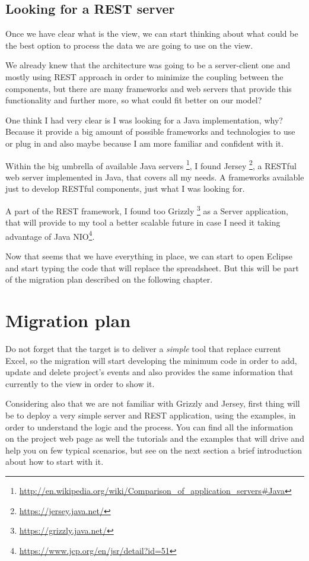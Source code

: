 \section{Looking for a REST server}
Once we have clear what is the view, we can start thinking about what could be
the best option to process the data we are going to use on the view.

We already knew that the architecture was going to be a server-client one and
mostly using REST approach in order to minimize the coupling between the
components, but there are many frameworks and web servers that provide this
functionality and further more, so what could fit better on our model?

One think I had very clear is I was looking for a Java implementation, why?
Because it provide a big amount of possible frameworks and technologies to
use or plug in and also maybe because I am more familiar and confident
with it.

Within the big umbrella of available Java servers
\footnote{\url{http://en.wikipedia.org/wiki/Comparison\_of\_application\_servers\#Java}},
I found Jersey \footnote{\url{https://jersey.java.net/}}, a RESTful web server
implemented in Java, that covers all my needs. A frameworks available just to
develop RESTful components, just what I was looking for.

A part of the REST framework, I found too Grizzly
\footnote{\url{https://grizzly.java.net/}} as a Server application, that will
provide to my tool a better scalable future in case I need it taking
advantage of Java NIO\footnote{\url{https://www.jcp.org/en/jsr/detail?id=51}}.

Now that seems that we have everything in place, we can start to open Eclipse
and start typing the code that will replace the spreadsheet. But this will be
part of the migration plan described on the following chapter.

\chapter{Migration plan}
Do not forget that the target is to deliver a \emph{simple} tool that replace
current Excel, so the migration will start developing the minimum code in order
to add, update and delete project's events and also provides the same
information that currently to the view in order to show it.

Considering also that we are not familiar with Grizzly and Jersey, first thing
will be to deploy a very simple server and REST application, using the examples,
in order to understand the logic and the process. You can find all the
information on the project web page as well the tutorials and the examples that
will drive and help you on few typical scenarios, but see on the next section a
brief introduction about how to start with it.

